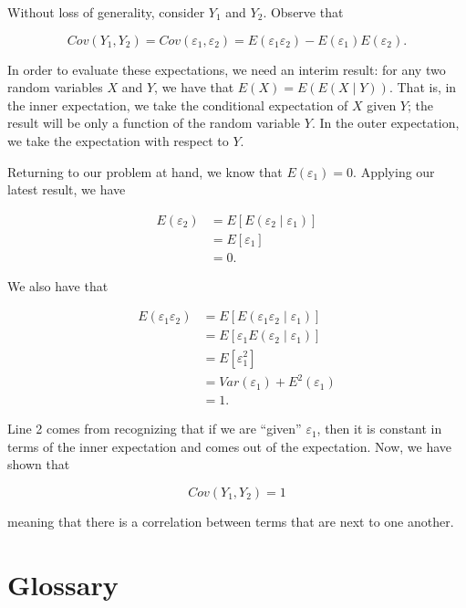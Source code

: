 \documentclass[
  letterpaper,
  DIV=11,
  numbers=noendperiod]{scrreprt}
\theoremstyle{definition}
\theoremstyle{plain}
\theoremstyle{definition}
\theoremstyle{remark}
\begin{document}
Without loss of generality, consider \(Y_1\) and \(Y_2\). Observe that

\[Cov\left(Y_1, Y_2\right) = Cov\left(\varepsilon_1, \varepsilon_2\right) = E\left(\varepsilon_{1} \varepsilon_{2}\right) - E\left(\varepsilon_{1}\right)E\left(\varepsilon_{2}\right).\]

In order to evaluate these expectations, we need an interim result: for
any two random variables \(X\) and \(Y\), we have that
\(E(X) = E(E(X \mid Y))\). That is, in the inner expectation, we take
the conditional expectation of \(X\) given \(Y\); the result will be
only a function of the random variable \(Y\). In the outer expectation,
we take the expectation with respect to \(Y\).

Returning to our problem at hand, we know that
\(E\left(\varepsilon_1\right) = 0\). Applying our latest result, we have

\[
\begin{aligned}
  E\left(\varepsilon_2\right) 
    &= E\left[E\left(\varepsilon_2 \mid \varepsilon_1\right)\right] \\
    &= E\left[\varepsilon_1\right] \\
    &= 0.
\end{aligned}
\]

We also have that

\[
\begin{aligned}
  E\left(\varepsilon_1 \varepsilon_2\right) 
    &= E\left[E\left(\varepsilon_1 \varepsilon_2 \mid \varepsilon_1\right)\right] \\
    &= E\left[ \varepsilon_1 E\left(\varepsilon_2 \mid \varepsilon_1\right)\right] \\
    &= E\left[\varepsilon_1^2\right] \\
    &= Var\left(\varepsilon_1\right) + E^2\left(\varepsilon_1\right) \\
    &= 1.
\end{aligned}
\]

Line 2 comes from recognizing that if we are ``given''
\(\varepsilon_1\), then it is constant in terms of the inner expectation
and comes out of the expectation. Now, we have shown that

\[Cov\left(Y_1, Y_2\right) = 1\]

meaning that there is a correlation between terms that are next to one
another.

\cleardoublepage
{}
{}
\appendix

\chapter{Glossary}\label{glossary}
\end{document}
